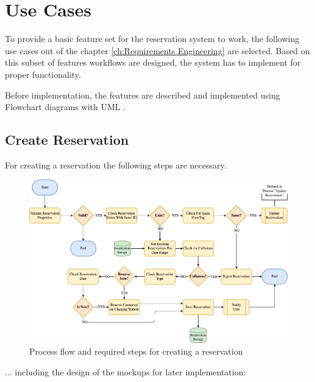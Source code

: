 \section{Use Cases}
\label{ch:Design:sec:Use Cases}

To provide a basic feature set for the reservation system to work, the following use cases out of the chapter \ref{ch:Requirements Engineering} are selected. Based on this subset of features workflows are designed, the system has to implement for proper functionality.

Before implementation, the features are described and implemented using Flowchart diagrams with UML \cite{noauthor_welcome_nodate}.

\subsection{Create Reservation}
\label{ch:Design:sec:Use Cases:ssec:Create Reservation}

For creating a reservation the following steps are necessary.

\begin{figure}[!ht]
    \centering
    \includegraphics[scale=0.4]{resources/images/main/5_design/processes/ReservationCreate.png}
    \caption{Process flow and required steps for creating a reservation}
    \label{fig:create-reservation-flowchart}
\end{figure}

... including the design of the mockups for later implementation:


